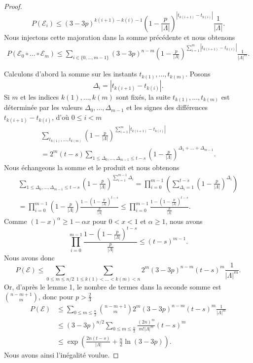 \documentclass[titlepage,a4paper,12pt]{article}
\newcounter{d}
\newcounter{t}
\newcounter{p}
\newcounter{c}
\newcounter{a}
\newcounter{l}
\begin{document}
\begin{proof}
$$P(\mathcal{E}_i)\leqslant (3-3p)^{k(i+1)-k(i)-1}\left(1-\frac{p}{|\Lambda|}\right)^{|t_{k(i+1)}-t_{k(i)}|}\frac{1}{|\Lambda|}.$$
Nous injectons cette majoration dans la somme précédente et nous obtenons
\begin{multline*}
P(\mathcal{E}_0\circ\dots\circ \mathcal{E}_m) \leqslant \sum_{i\in \{0,\dots,m-1\}}(3-3p)^{n-m}\left(1-\frac{p}{|\Lambda|}\right)^{\displaystyle \sum_{i=1}^{m}|t_{k(i+1)}-t_{k(i)}|}\frac{1}{|\Lambda|^m}.
\end{multline*}

Calculons d'abord la somme sur les instants $t_{k(1)},\dots,t_{k(m)}$. Posons $$\Delta_i = |t_{k(i+1)}-t_{k(i)}|.$$ Si $m$ et les indices $k(1),\dots,k(m)$ sont fixés, la suite $t_{k(1)},\dots,t_{k(m)}$ est déterminée par les valeurs $\Delta_0,\dots,\Delta_{m-1}$ et les signes des différences $t_{k(i+1)}-t_{k(i)}$, d'où $0\leqslant i < m$
\begin{multline*}\sum_{t_{k(1)},\dots,t_{k(m)}}\left(1-\frac{p}{|\Lambda|}\right)^{\displaystyle\sum_{i=1}^{m}|t_{k(i+1)}-t_{k(i)}|} \\ = 2^{m}(t-s)\sum_{1\leqslant\Delta_0,\dots,\Delta_{m-1}\leqslant t-s}\left(1-\frac{p}{|\Lambda|}\right)^{\Delta_1+\dots+\Delta_{m-1}}.
\end{multline*}
Nous échangeons la somme et le produit et nous obtenons
\begin{multline*}\sum_{1\leqslant\Delta_0,\dots,\Delta_{m-1}\leqslant t-s}\left(1-\frac{p}{|\Lambda|}\right)^{\sum_{i=1}^{m-1}\Delta_i} = \prod_{i=0}^{m-1}\left(\sum_{\Delta_i = 1}^{t-s}\left(1-\frac{p}{|\Lambda|}\right)^{\Delta_i}\right)\\= \prod_{i=0}^{m-1}\left(1-\frac{p}{|\Lambda|}\right)\frac{\displaystyle1-\left(1-\frac{p}{|\Lambda|}\right)^{t-s}}{\displaystyle\frac{p}{|\Lambda|}}\leqslant \prod_{i=0}^{m-1}\frac{\displaystyle1-\left(1-\frac{p}{|\Lambda|}\right)^{t-s}}{\displaystyle\frac{p}{|\Lambda|}}.
\end{multline*}
Comme $(1-x)^\alpha \geqslant 1-\alpha x$ pour $0<x<1$ et $\alpha\geqslant 1$, nous avons 
$$ \prod_{i=0}^{m-1}\frac{\displaystyle 1-\left(1-\frac{p}{|\Lambda|}\right)^{t-s}}{\displaystyle\frac{p}{|\Lambda|}} \leqslant(t-s)^{m-1}.
$$
Nous avons donc
$$P(\mathcal{E}) \leqslant\sum_{0\leqslant m \leqslant n/2}\sum_{1\leqslant k(1)<\dots<k(m)<n} 2^{m}(3-3p)^{n-m}(t-s)^m\frac{1}{|\Lambda|^m}.
$$
Or, d'après le lemme 1, le nombre de termes dans la seconde somme est $\binom{n-m+1}{m}$, donc pour $p> \frac{2}{3}$
\begin{align*}P\left(\mathcal{E}\right)& \leqslant\sum_{0\leqslant m \leqslant\frac{n}{2}}\binom{n-m+1}{m} 2^{m}(3-3p)^{n-m}(t-s)^m\frac{1}{|\Lambda|^m}\\
& \leqslant (3-3p)^{n/2}\sum_{0\leqslant m \leqslant\frac{n}{2}}\frac{(2n)^m}{m!|\Lambda|^m}(t-s)^m \\
&\leqslant \exp\left(\frac{2n(t-s)}{|\Lambda|}+\frac{n}{2}\ln(3-3p)\right).
\end{align*}
Nous avons ainsi l'inégalité voulue.
\end{proof}
\end{document}
